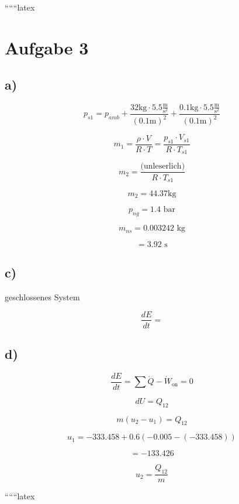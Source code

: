 
``````latex


\section*{Aufgabe 3}

\subsection*{a)}
\[
p_{s1} = p_{amb} + \frac{32 \text{kg} \cdot 5.5 \frac{\text{m}}{\text{s}^2}}{(0.1 \text{m})^2} + \frac{0.1 \text{kg} \cdot 5.5 \frac{\text{m}}{\text{s}^2}}{(0.1 \text{m})^2}
\]

\[
m_1 = \frac{\rho \cdot V}{R \cdot T} = \frac{p_{s1} \cdot V_{s1}}{R \cdot T_{s1}}
\]

\[
m_2 = \frac{\text{(unleserlich)}}{R \cdot T_{s1}}
\]

\[
m_2 = 44.37 \text{kg}
\]

\[
p_{ng} = 1.4 \text{ bar}
\]

\[
m_{ns} = 0.003242 \text{ kg}
\]

\[
= 3.92 \text{ s}
\]

\subsection*{c)}
geschlossenes System

\[
\frac{dE}{dt} = 
\]

\subsection*{d)}
\[
\frac{dE}{dt} = \sum \dot{Q} - \dot{W}_{\text{on}} = 0
\]

\[
dU = Q_{12}
\]

\[
m(u_2 - u_1) = Q_{12}
\]

\[
u_1 = -333.458 + 0.6 \left( -0.005 - (-333.458) \right)
\]

\[
= -133.426
\]

\[
u_2 = \frac{Q_{12}}{m}
\]

``````latex


